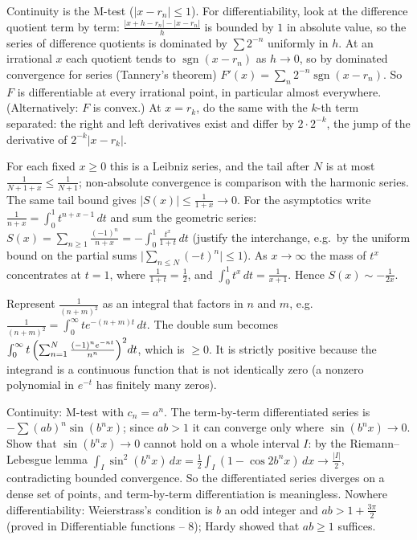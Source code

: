 \documentclass[11pt,a4paper]{article}
\begin{document}

Continuity is the M-test (\(\lvert x-r_n\rvert\le1\)). For differentiability, look at the difference quotient term by term: \(\frac{\lvert x+h-r_n\rvert-\lvert x-r_n\rvert}h\) is bounded by \(1\) in absolute value, so the series of difference quotients is dominated by \(\sum2^{-n}\) uniformly in \(h\).
At an irrational \(x\) each quotient tends to \(\operatorname{sgn}(x-r_n)\) as \(h\to0\), so by dominated convergence for series (Tannery's theorem) \(F'(x)=\sum_n2^{-n}\operatorname{sgn}(x-r_n)\). So \(F\) is differentiable at every irrational point, in particular almost everywhere. (Alternatively: \(F\) is convex.)
At \(x=r_k\), do the same with the \(k\)-th term separated: the right and left derivatives exist and differ by \(2\cdot2^{-k}\), the jump of the derivative of \(2^{-k}\lvert x-r_k\rvert\).

For each fixed \(x\ge0\) this is a Leibniz series, and the tail after \(N\) is at most \(\frac1{N+1+x}\le\frac1{N+1}\); non-absolute convergence is comparison with the harmonic series. The same tail bound gives \(\lvert S(x)\rvert\le\frac1{1+x}\to0\).
For the asymptotics write \(\frac1{n+x}=\int_0^1t^{n+x-1}\,dt\) and sum the geometric series: \(S(x)=\sum_{n\ge1}\frac{(-1)^n}{n+x}=-\int_0^1\frac{t^x}{1+t}\,dt\) (justify the interchange, e.g.~by the uniform bound on the partial sums \(\bigl\lvert\sum_{n\le N}(-t)^n\bigr\rvert\le1\)).
As \(x\to\infty\) the mass of \(t^x\) concentrates at \(t=1\), where \(\frac1{1+t}=\frac12\), and \(\int_0^1t^x\,dt=\frac1{x+1}\). Hence \(S(x)\sim-\frac1{2x}\).

Represent \(\frac1{(n+m)^2}\) as an integral that factors in \(n\) and \(m\), e.g.~\(\frac1{(n+m)^2}=\int_0^\infty te^{-(n+m)t}\,dt\).
The double sum becomes \(\int_0^\infty t\,\Bigl(\sum_{n=1}^N\frac{(-1)^ne^{-nt}}{n^n}\Bigr)^2dt\), which is \(\ge0\). It is strictly positive because the integrand is a continuous function that is not identically zero (a nonzero polynomial in \(e^{-t}\) has finitely many zeros).

Continuity: M-test with \(c_n=a^n\). The term-by-term differentiated series is \(-\sum(ab)^n\sin(b^nx)\); since \(ab\gt1\) it can converge only where \(\sin(b^nx)\to0\).
Show that \(\sin(b^nx)\to0\) cannot hold on a whole interval \(I\): by the Riemann--Lebesgue lemma \(\int_I\sin^2(b^nx)\,dx=\frac12\int_I(1-\cos2b^nx)\,dx\to\frac{\lvert I\rvert}2\), contradicting bounded convergence. So the differentiated series diverges on a dense set of points, and term-by-term differentiation is meaningless. Nowhere differentiability: Weierstrass's condition is \(b\) an odd integer and \(ab\gt1+\frac{3\pi}2\) (proved in Differentiable functions -- 8); Hardy showed that \(ab\ge1\) suffices.
\end{document}
